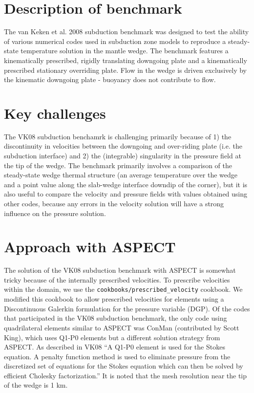 \documentclass[11pt,letterpaper]{article}
\begin{document}
\section{Description of benchmark}
The van Keken et al. 2008 subduction benchmark was designed to test the ability of various numerical codes used in subduction zone models to reproduce a steady-state temperature solution in the mantle wedge. The benchmark features a kinematically prescribed, rigidly translating downgoing plate and a kinematically prescribed stationary overriding plate. Flow in the wedge is driven exclusively by the kinematic downgoing plate - buoyancy does not contribute to flow.

\section{Key challenges}
The VK08 subduction benchamrk is challenging primarily because of 1) the discontinuity in velocities between the downgoing and over-riding plate (i.e. the subduction interface) and 2) the (integrable) singularity in the pressure field at the tip of the wedge. The benchmark primarily involves a comparison of the steady-state wedge thermal structure (an average temperature over the wedge and a point value along the slab-wedge interface downdip of the corner), but it is also useful to compare the velocity and pressure fields with values obtained using other codes, because any errors in the velocity solution will have a strong influence on the pressure solution.

\section{Approach with ASPECT}
The solution of the VK08 subduction benchmark with ASPECT is somewhat tricky because of the internally prescribed velocities. To prescribe velocities within the domain, we use the \texttt{cookbooks/prescribed\_velocity} cookbook. We modified this cookbook to allow prescribed velocities for elements using a Discontinuous Galerkin formulation for the pressure variable (DGP). Of the codes that participated in the VK08 subduction benchmark, the only code using quadrilateral elements similar to ASPECT was ConMan (contributed by Scott King), which uses Q1-P0 elements but a different solution strategy from ASPECT. As described in VK08 ``A Q1-P0 element is used for the Stokes equation. A penalty function method is used to eliminate pressure from the discretized set of equations for the Stokes equation which can then be solved by efficient Cholesky factorization.'' It is noted that the mesh resolution near the tip of the wedge is 1 km.
\end{document}

